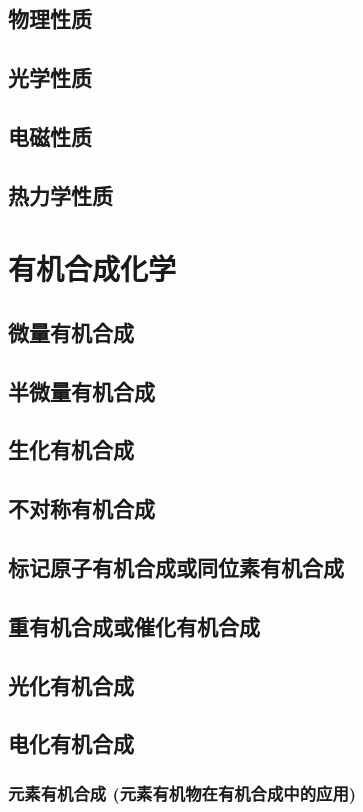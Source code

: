 \documentclass[UTF8]{../03-Chemistry}
\begin{document}
    \subsection{物理性质}
    \subsection{光学性质}
    \subsection{电磁性质}
    \subsection{热力学性质}



\section{有机合成化学}
    \subsection{微量有机合成}
    \subsection{半微量有机合成}
    \subsection{生化有机合成}
    \subsection{不对称有机合成}
    \subsection{标记原子有机合成或同位素有机合成}
    \subsection{重有机合成或催化有机合成}
    \subsection{光化有机合成}
    \subsection{电化有机合成}
        \subsubsection{元素有机合成 (元素有机物在有机合成中的应用)}
\end{document}
